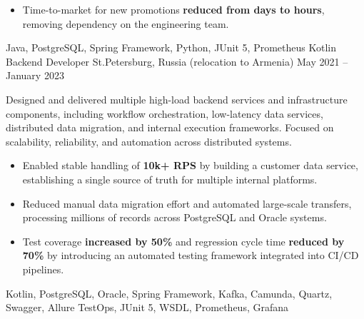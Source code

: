 \begin{works}
{            \begin{itemize}
                \item {
                    Time-to-market for new promotions \textbf{reduced from days to hours}, removing dependency on the engineering team.
                }
            \end{itemize}
        }
        {Java, PostgreSQL, Spring Framework, Python, JUnit 5, Prometheus}
    \work
        {Kotlin Backend Developer} {} {St.Petersburg, Russia (relocation to Armenia)} {May 2021 -- January 2023}
        {
            Designed and delivered multiple high-load backend services and infrastructure components, including workflow orchestration, low-latency data services, distributed data migration, and internal execution frameworks. Focused on scalability, reliability, and automation across distributed systems.
        
            \begin{itemize}
                \item {
                    Enabled stable handling of \textbf{10k+ RPS} by building a customer data service, establishing a single source of truth for multiple internal platforms.
                }
                \item {
                    Reduced manual data migration effort and automated large-scale transfers, processing millions of records across PostgreSQL and Oracle systems.
                }
                \item {
                    Test coverage \textbf{increased by 50\%} and regression cycle time \textbf{reduced by 70\%} by introducing an automated testing framework integrated into CI/CD pipelines.
                }
            \end{itemize}
        }
        {
            Kotlin, PostgreSQL, Oracle, Spring Framework, Kafka, Camunda, Quartz, Swagger, Allure TestOps, JUnit 5, WSDL, Prometheus, Grafana
        }
\end{works}

